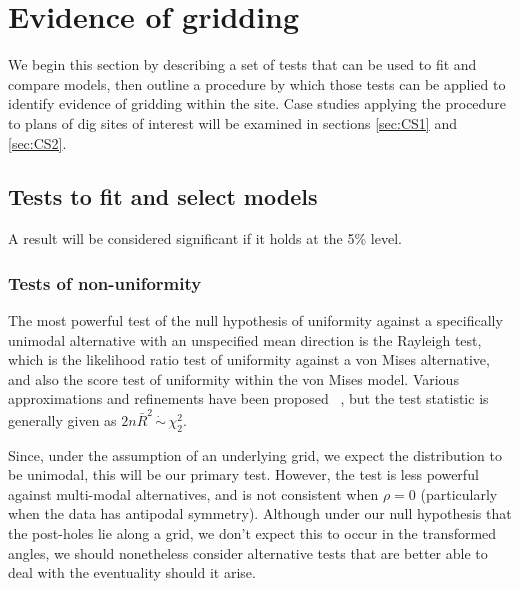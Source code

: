 \documentclass[../../ArchStats.tex]{subfiles}
\begin{document}

\section{Evidence of gridding}

We begin this section by describing a set of tests that can be used to fit and compare models, then outline a procedure by which those tests can be applied to identify evidence of gridding within the site. Case studies applying the procedure to plans of dig sites of interest will be examined in sections \ref{sec:CS1} and \ref{sec:CS2}.

\subsection{Tests to fit and select models}
\label{sec:model-fitting-tests}

A result will be considered significant if it holds at the 5\% level. 

\subsubsection{Tests of non-uniformity}
\label{sec:unif-tests}

The most powerful test of the null hypothesis of uniformity against a specifically unimodal alternative with an unspecified mean direction is the Rayleigh test, which is the likelihood ratio test of uniformity against a von Mises alternative, and also the score test of uniformity within the von Mises model. Various approximations and refinements have been proposed ~\cite{Mardia1999}, but the test statistic is generally given as $2n\bar{R}^2 \, \dot{\sim} \, \chi^2_2$.

Since, under the assumption of an underlying grid, we expect the distribution to be unimodal, this will be our primary test. However, the test is less powerful against multi-modal alternatives, and is not consistent when $\rho = 0$ (particularly when the data has antipodal symmetry). Although under our null hypothesis that the post-holes lie along a grid, we don't expect this to occur in the transformed angles, we should nonetheless consider alternative tests that are better able to deal with the eventuality should it arise.
\end{document}
